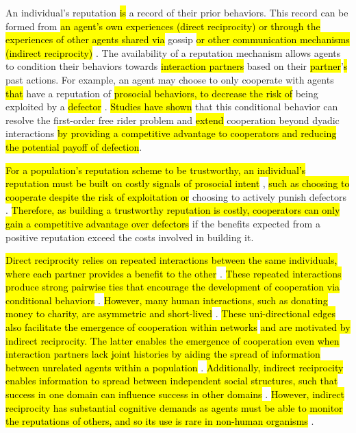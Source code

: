 \documentclass[sn-aps,numbered]{sn-jnl}%
\theoremstyle{thmstyleone}%
\theoremstyle{thmstyletwo}%
\theoremstyle{thmstylethree}%
\begin{document}
An individual's reputation \hl{is} a record of their prior behaviors. This record can be formed from \hl{an agent's own experiences (direct reciprocity) or through the experiences of other agents shared via} gossip \hl{or other communication mechanisms (indirect reciprocity)} \citep{Roberts2021, networks_reliable_rep_coop_review, Gross2019, language_of_coop, schmid2021unified}. The availability of a reputation mechanism allows agents to condition their behaviors towards \hl{interaction partners} based on their \hl{partner}'\hl{s} past actions. For example, an agent may choose to only cooperate with agents \hl{that} have a reputation of \hl{prosocial behaviors, to decrease the risk of} being exploited by a \hl{defector} \citep{parity_sympathy_reciprocity}. \hl{Studies have shown} that this conditional behavior can resolve the first-order free rider problem and \hl{extend} cooperation beyond dyadic interactions \citep{networks_reliable_rep_coop_review} \hl{by providing a competitive advantage to cooperators and reducing the potential payoff of defection}.  

\hl{For a population's reputation scheme to be trustworthy, an individual's reputation must be built on costly signals of prosocial intent} \citep{Jordan2016ThirdpartyPA, Milinski2002, partner_choice_competitive_altruism}, \hl{such as choosing to cooperate despite the risk of exploitation or} choosing to actively punish defectors \citep{networks_reliable_rep_coop_review, Gross2019, Rand2011, eccles2019learningreciprocity, boyd1992punishment}. \hl{Therefore, as building a trustworthy reputation is costly, cooperators can only gain a competitive advantage over defectors} if the benefits expected from a positive reputation exceed the costs involved in building it.

\hl{Direct reciprocity relies on repeated interactions between the same individuals, where each partner provides a benefit to the other} \citep{schmid2021unified}. \hl{These repeated interactions produce strong pairwise ties that encourage the development of cooperation via conditional behaviors} \citep{allen2017evolutionary}. \hl{However, many human interactions, such as donating money to charity, are asymmetric and short-lived} \citep{Nowak2006FiveRF}. \hl{These uni-directional edges also facilitate the emergence of cooperation within networks} \citep{asymmetric_social_network} \hl{and are motivated by indirect reciprocity. The latter enables the emergence of cooperation even when interaction partners lack joint histories by aiding the spread of information between unrelated agents within a population} \citep{schmid2021unified, Nowak2006FiveRF}. \hl{Additionally, indirect reciprocity enables information to spread between independent social structures, such that success in one domain can influence success in other domains} \citep{multilayer_network}. \hl{However, indirect reciprocity has substantial cognitive demands as agents must be able to monitor the reputations of others, and so its use is rare in non-human organisms} \citep{Nowak2006FiveRF}.
\end{document}
